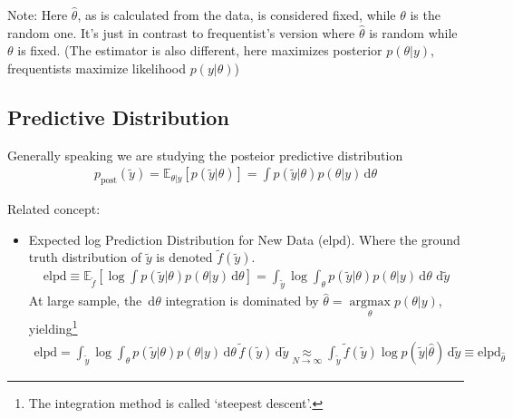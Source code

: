 Note: Here $ \hat{\theta } $, as is calculated from the data, is considered fixed, while $ \theta  $ is the random one. It's just in contrast to frequentist's version where $ \hat{\theta } $ is random while $ \theta  $ is fixed. (The estimator is also different, here maximizes posterior $ p(\theta |y) $, frequentists maximize likelihood $ p(y|\theta ) $)





\subsection{Predictive Distribution}
Generally speaking we are studying the posteior predictive distribution
\begin{align}
    p_\mathrm{ \text{post} }(\tilde{y})=\mathbb{E}_{\theta |y} \left[ p(\tilde{y}|\theta ) \right]  =\int   p(\tilde{y}|\theta )p(\theta |y)\,\mathrm{d}\theta  
\end{align}

Related concept:
\begin{itemize}[topsep=2pt,itemsep=0pt]
    \item Expected log Prediction Distribution for New Data ($ \mathrm{ elpd }  $). Where the ground truth distribution of $ \tilde{y} $ is denoted $ \tilde{f}(\tilde{y}) $.
    \begin{align}
        \mathrm{ elpd } \equiv \mathbb{E}_{\tilde{f}}\left[ \log \int   p(\tilde{y}|\theta )p(\theta |y)\,\mathrm{d}\theta   \right]= \int_{\tilde{y}} \log \int_\theta    p(\tilde{y}|\theta )p(\theta |y)\,\mathrm{d}\theta\,\,\mathrm{d}\tilde{y}
    \end{align}
    At large sample, the $ \,\mathrm{d}\theta  $ integration is dominated by $ \hat{\theta }=\mathop{ \arg\max }\limits_{\theta }p(\theta |y) $, yielding\footnote{The integration method is called `steepest descent'.}
    \begin{align}
        \mathrm{ elpd }= \int_{\tilde{y}} \log \int_\theta    p(\tilde{y}|\theta )p(\theta |y)\,\mathrm{d}\theta\, \tilde{f}(\tilde{y})\,\mathrm{d}\tilde{y}\mathop{ \approx }\limits_{N\to\infty}  \int_{\tilde{y}} \tilde{f}(\tilde{y})\log p(\tilde{y}|\hat{\theta } )\,\mathrm{d}\tilde{y}\equiv \mathrm{ elpd }_{\hat{\theta }} 
    \end{align}
    
    
    
\end{itemize}


